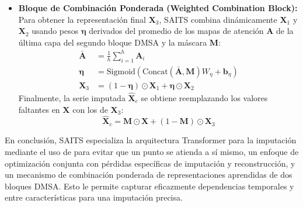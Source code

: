\begin{itemize}
    \item \textbf{Bloque de Combinación Ponderada (Weighted Combination Block):}
    Para obtener la representación final $\mathbf{X}_3$, SAITS combina dinámicamente $\mathbf{X}_1$ y $\mathbf{X}_2$ usando pesos $\boldsymbol{\eta}$ derivados del promedio de los mapas de atención $\mathbf{A}$ de la última capa del segundo bloque DMSA y la máscara $\mathbf{M}$:
    \begin{align}
    \bar{\mathbf{A}} &= \frac{1}{h} \sum_{i=1}^{h} \mathbf{A}_i \label{eq:saits_avg_attention} \\
    \boldsymbol{\eta} &= \text{Sigmoid}(\text{Concat}(\bar{\mathbf{A}}, \mathbf{M})W_{\eta} + \mathbf{b}_{\eta}) \label{eq:saits_eta_weights} \\
    \mathbf{X}_3 &= (1-\boldsymbol{\eta}) \odot \mathbf{X}_1 + \boldsymbol{\eta} \odot \mathbf{X}_2 \label{eq:saits_x3}
    \end{align}
    Finalmente, la serie imputada $\hat{\mathbf{X}}_c$ se obtiene reemplazando los valores faltantes en $\mathbf{X}$ con los de $\mathbf{X}_3$:
    \begin{equation}
    \hat{\mathbf{X}}_c = \mathbf{M} \odot \mathbf{X} + (1-\mathbf{M}) \odot \mathbf{X}_3
    \label{eq:saits_x_c_final}
    \end{equation}
\end{itemize}

En conclusión, SAITS especializa la arquitectura Transformer para la imputación mediante el uso de  para evitar que un punto se atienda a sí mismo, un enfoque de optimización conjunta con pérdidas específicas de imputación y reconstrucción, y un mecanismo de combinación ponderada de representaciones aprendidas de dos bloques DMSA. Esto le permite capturar eficazmente dependencias temporales y entre características para una imputación precisa.
